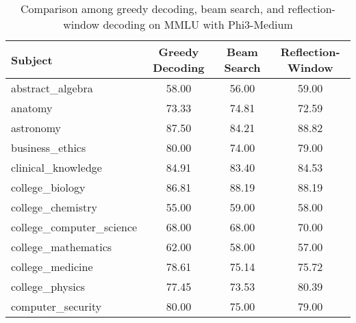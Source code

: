 \begingroup
\renewcommand{\arraystretch}{1}
\begin{table}[t]
    \caption{Comparison among greedy decoding, beam search, and reflection-window decoding on MMLU with Phi3-Medium}
    \label{tab:mmlu_subject_phi3}
    \centering
    \footnotesize
    \begin{tabular}{L{0.35}C{0.15}C{0.15}C{0.15}}
        \toprule
        \textbf{Subject}                        & \textbf{Greedy Decoding} & \textbf{Beam Search} & \textbf{Reflection-Window} \\
        \midrule
        abstract\_algebra                       & 58.00                    & 56.00                & 59.00                      \\
        anatomy                                 & 73.33                    & 74.81                & 72.59                      \\
        astronomy                               & 87.50                    & 84.21                & 88.82                      \\
        business\_ethics                        & 80.00                    & 74.00                & 79.00                      \\
        clinical\_knowledge                     & 84.91                    & 83.40                & 84.53                      \\
        college\_biology                        & 86.81                    & 88.19                & 88.19                      \\
        college\_chemistry                      & 55.00                    & 59.00                & 58.00                      \\
        college\_computer\_science              & 68.00                    & 68.00                & 70.00                      \\
        college\_mathematics                    & 62.00                    & 58.00                & 57.00                      \\
        college\_medicine                       & 78.61                    & 75.14                & 75.72                      \\
        college\_physics                        & 77.45                    & 73.53                & 80.39                      \\
        computer\_security                      & 80.00                    & 75.00                & 79.00                      \\

\end{tabular}
\end{table}
